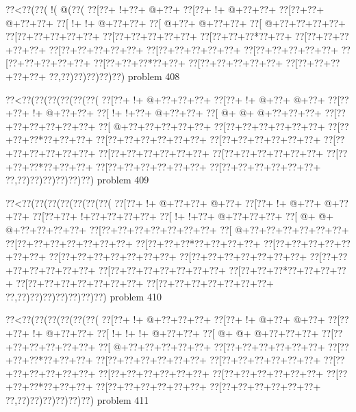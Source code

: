 \vbox{\vbox{\goo
\0??<\0??(\0??(\- !(\- @(\0??(
\0??[\0??+\- !+\0??+\- @+\0??+
\0??[\0??+\- !+\- @+\0??+\0??+
\0??[\0??+\0??+\- @+\0??+\0??+
\0??[\- !+\- !+\- @+\0??+\0??+
\0??[\- @+\0??+\- @+\0??+\0??+
\0??[\- @+\0??+\0??+\0??+\0??+
\0??[\0??+\0??+\0??+\0??+\0??+
\0??[\0??+\0??+\0??+\0??+\0??+
\0??[\0??+\0??+\0??*\0??+\0??+
\0??[\0??+\0??+\0??+\0??+\0??+
\0??[\0??+\0??+\0??+\0??+\0??+
\0??[\0??+\0??+\0??+\0??+\0??+
\0??[\0??+\0??+\0??+\0??+\0??+
\0??[\0??+\0??+\0??+\0??+\0??+
\0??[\0??+\0??+\0??*\0??+\0??+
\0??[\0??+\0??+\0??+\0??+\0??+
\0??[\0??+\0??+\0??+\0??+\0??+
\0??,\0??)\0??)\0??)\0??)\0??)
}
\hfil problem 408\hfil\break
}

\vbox{\vbox{\goo
\0??<\0??(\0??(\0??(\0??(\0??(\0??(
\0??[\0??+\- !+\- @+\0??+\0??+\0??+
\0??[\0??+\- !+\- @+\0??+\- @+\0??+
\0??[\0??+\0??+\- !+\- @+\0??+\0??+
\0??[\- !+\- !+\0??+\- @+\0??+\0??+
\0??[\- @+\- @+\- @+\0??+\0??+\0??+
\0??[\0??+\0??+\0??+\0??+\0??+\0??+
\0??[\- @+\0??+\0??+\0??+\0??+\0??+
\0??[\0??+\0??+\0??+\0??+\0??+\0??+
\0??[\0??+\0??+\0??*\0??+\0??+\0??+
\0??[\0??+\0??+\0??+\0??+\0??+\0??+
\0??[\0??+\0??+\0??+\0??+\0??+\0??+
\0??[\0??+\0??+\0??+\0??+\0??+\0??+
\0??[\0??+\0??+\0??+\0??+\0??+\0??+
\0??[\0??+\0??+\0??+\0??+\0??+\0??+
\0??[\0??+\0??+\0??*\0??+\0??+\0??+
\0??[\0??+\0??+\0??+\0??+\0??+\0??+
\0??[\0??+\0??+\0??+\0??+\0??+\0??+
\0??,\0??)\0??)\0??)\0??)\0??)\0??)
}
\hfil problem 409\hfil\break
}

\vbox{\vbox{\goo
\0??<\0??(\0??(\0??(\0??(\0??(\0??(\0??(
\0??[\0??+\- !+\- @+\0??+\0??+\- @+\0??+
\0??[\0??+\- !+\- @+\0??+\- @+\0??+\0??+
\0??[\0??+\0??+\- !+\0??+\0??+\0??+\0??+
\0??[\- !+\- !+\0??+\- @+\0??+\0??+\0??+
\0??[\- @+\- @+\- @+\0??+\0??+\0??+\0??+
\0??[\0??+\0??+\0??+\0??+\0??+\0??+\0??+
\0??[\- @+\0??+\0??+\0??+\0??+\0??+\0??+
\0??[\0??+\0??+\0??+\0??+\0??+\0??+\0??+
\0??[\0??+\0??+\0??*\0??+\0??+\0??+\0??+
\0??[\0??+\0??+\0??+\0??+\0??+\0??+\0??+
\0??[\0??+\0??+\0??+\0??+\0??+\0??+\0??+
\0??[\0??+\0??+\0??+\0??+\0??+\0??+\0??+
\0??[\0??+\0??+\0??+\0??+\0??+\0??+\0??+
\0??[\0??+\0??+\0??+\0??+\0??+\0??+\0??+
\0??[\0??+\0??+\0??*\0??+\0??+\0??+\0??+
\0??[\0??+\0??+\0??+\0??+\0??+\0??+\0??+
\0??[\0??+\0??+\0??+\0??+\0??+\0??+\0??+
\0??,\0??)\0??)\0??)\0??)\0??)\0??)\0??)
}
\hfil problem 410\hfil\break
}

\vbox{\vbox{\goo
\0??<\0??(\0??(\0??(\0??(\0??(\0??(
\0??[\0??+\- !+\- @+\0??+\0??+\0??+
\0??[\0??+\- !+\- @+\0??+\- @+\0??+
\0??[\0??+\0??+\- !+\- @+\0??+\0??+
\0??[\- !+\- !+\- !+\- @+\0??+\0??+
\0??[\- @+\- @+\- @+\0??+\0??+\0??+
\0??[\0??+\0??+\0??+\0??+\0??+\0??+
\0??[\- @+\0??+\0??+\0??+\0??+\0??+
\0??[\0??+\0??+\0??+\0??+\0??+\0??+
\0??[\0??+\0??+\0??*\0??+\0??+\0??+
\0??[\0??+\0??+\0??+\0??+\0??+\0??+
\0??[\0??+\0??+\0??+\0??+\0??+\0??+
\0??[\0??+\0??+\0??+\0??+\0??+\0??+
\0??[\0??+\0??+\0??+\0??+\0??+\0??+
\0??[\0??+\0??+\0??+\0??+\0??+\0??+
\0??[\0??+\0??+\0??*\0??+\0??+\0??+
\0??[\0??+\0??+\0??+\0??+\0??+\0??+
\0??[\0??+\0??+\0??+\0??+\0??+\0??+
\0??,\0??)\0??)\0??)\0??)\0??)\0??)
}
\hfil problem 411\hfil\break
}

